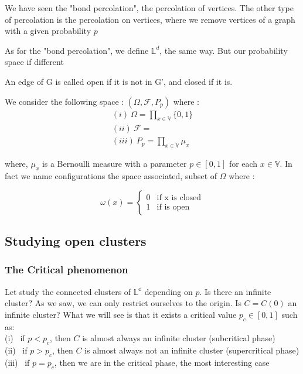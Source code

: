 \documentclass{article}
\begin{document}
We have seen the "bond percolation", the percolation of vertices. The other type of percolation is the percolation on vertices, where we remove vertices of a graph with a given probability $p$

As for the "bond percolation", we define $\mathbb{L}^d$, the same way.
But our probability space if different

An edge of G is called open if it is not in G', and closed if it is. 

We consider the following space : $(\Omega, \mathscr{F}, P_p)$ where :
\begin{gather*}
(i) \ \Omega = \prod_{x \in \mathbb{V}}{\{0,1\}} \\
(ii) \ \mathscr{F}=\\
(iii) \ P_p = \prod_{x \in \mathbb{V}}{\mu_{x}}
\end{gather*}

where, $\mu_{x}$ is a Bernoulli measure with a parameter $p\in [0,1]$ for each $x\in\mathbb{V}$. In fact we name configurations the space associated, subset of $\Omega$ where :

$$
\omega(x) = \left\{
    \begin{array}{ll}
        0 & \mbox{if x is closed}\\
        1 & \mbox{if  is open}
    \end{array}
\right.
$$

\subsection{Studying open clusters}
\subsubsection{The Critical phenomenon}
Let study the connected clusters of $\mathbb{L^d}$ depending on $p$. Is there an infinite cluster?
As we saw, we can only restrict ourselves to the origin. Is $C = C(0)$ an infinite cluster?
What we will see is that it exists a critical value $p_c\in [0,1]$ such as: \\

(i) \ if $p < p_c$, then $C$ is almost always an infinite cluster (subcritical phase) \\
(ii) \ if $p > p_c$, then $C$ is almost always not an infinite cluster (supercritical phase) \\
(iii) \ if $p = p_c$, then we are in the critical phase, the most interesting case \\
\end{document}
